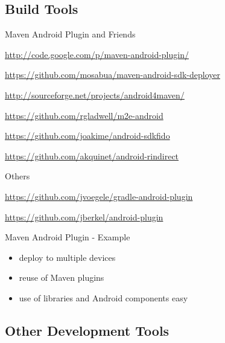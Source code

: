 \documentclass[aspectratio=169]{beamer}
\newcommand{\surl}[1] {{\tiny \url{#1}}}
\begin{document}
  \subsection{Build Tools}

    \begin{frame}{Maven Android Plugin and Friends}
      \begin{description}
       \item<1->[Maven Android Plugin] \surl{http://code.google.com/p/maven-android-plugin/}
       \item<2->[Maven Android SDK Deployer] \surl{https://github.com/mosabua/maven-android-sdk-deployer}
       \item<3->[Android4Maven] \surl{http://sourceforge.net/projects/android4maven/}
       \item<4->[M2E Android] \surl{https://github.com/rgladwell/m2e-android}
       \item<5->[AndroidSDKFido] \surl{https://github.com/joakime/android-sdkfido}
       \item<6->[Android RIndirect] \surl{https://github.com/akquinet/android-rindirect}
      \end{description}
    \end{frame}

    \begin{frame}{Others}
      \begin{description}
       \item<1->[Gradle Android Plugin] \surl{https://github.com/jvoegele/gradle-android-plugin}
       \item<2->[SBT Android Plugin] \surl{https://github.com/jberkel/android-plugin}
      \end{description}
    \end{frame}

    \begin{frame}{Maven Android Plugin - Example}
      \begin{itemize}
       \item deploy to multiple devices
       \item reuse of Maven plugins
       \item use of libraries and Android components easy
      \end{itemize}
    \end{frame}



  \subsection{Other Development Tools}
\end{document}
